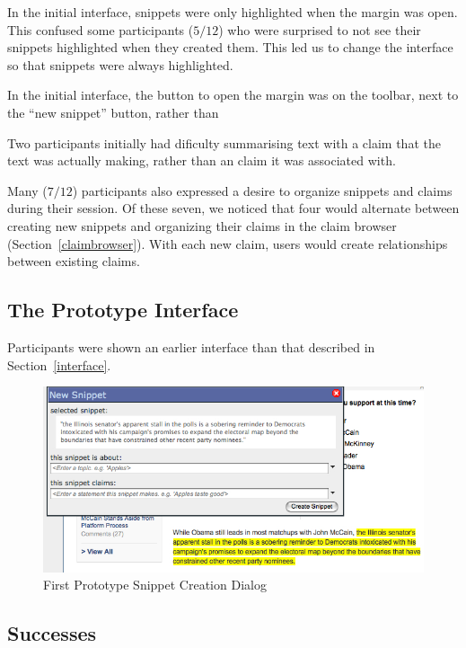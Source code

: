 \documentclass{chi2009}
\begin{document}
In the initial interface, snippets were only highlighted when the margin was open. This confused some participants ($5/12$) who were surprised to not see their snippets highlighted when they created them. This led us to change the interface so that snippets were always highlighted.

In the initial interface, the button to open the margin was on the toolbar, next to the ``new snippet'' button, rather than 

Two participants initially had dificulty summarising text with a claim that the text was actually making, rather than an claim it was associated with.

Many ($7/12$) participants also expressed a desire to organize snippets and claims during their session. Of these seven, we noticed that four would alternate between creating new snippets and organizing their claims in the claim browser (Section~\ref{claimbrowser}). With each new claim, users would create relationships between existing claims.




\subsection{The Prototype Interface}

Participants were shown an earlier interface than that described in Section~\ref{interface}. 

\begin{figure}[ht]
	\includegraphics[scale=0.35]{../screenshots/snippetdialog_sm.jpg}
	\caption{First Prototype Snippet Creation Dialog}
	\label{oldsnippetbox}
\end{figure}


\subsection{Successes}
\end{document}
